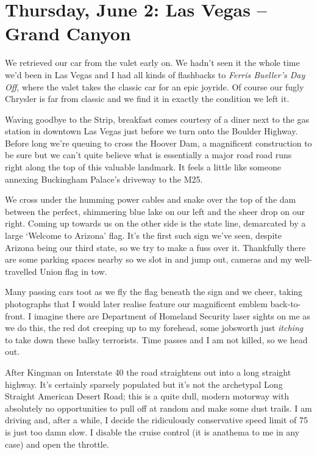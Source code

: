 \documentclass[a5paper,titlepage,draft]{book}
\begin{document}
\chapter[Las Vegas -- Grand Canyon]{Thursday, June 2: Las Vegas -- Grand Canyon}
We retrieved our car from the valet early on.  We hadn't seen it the whole time we'd been in Las Vegas and I had all kinds of flashbacks to \emph{Ferris Bueller's Day Off}, where the valet takes the classic car for an epic joyride.  Of course our fugly Chrysler is far from classic and we find it in exactly the condition we left it.

Waving goodbye to the Strip, breakfast comes courtesy of a diner next to the gas station in downtown Las Vegas just before we turn onto the Boulder Highway.  Before long we're queuing to cross the Hoover Dam, a magnificent construction to be sure but we can't quite believe what is essentially a major road road runs right along the top of this valuable landmark.  It feels a little like someone annexing Buckingham Palace's driveway to the M25.

We cross under the humming power cables and snake over the top of the dam between the perfect, shimmering blue lake on our left and the sheer drop on our right.  Coming up towards us on the other side is the state line, demarcated by a large `Welcome to Arizona' flag.  It's the first such sign we've seen, despite Arizona being our third state, so we try to make a fuss over it.  Thankfully there are some parking spaces nearby so we slot in and jump out, cameras and my well-travelled Union flag in tow.

Many passing cars toot as we fly the flag beneath the sign and we cheer, taking photographs that I would later realise feature our magnificent emblem back-to-front.  I imagine there are Department of Homeland Security laser sights on me as we do this, the red dot creeping up to my forehead, some jobsworth just \emph{itching} to take down these ballsy terrorists.  Time passes and I am not killed, so we head out.

After Kingman on Interstate 40 the road straightens out into a long straight highway.  It's certainly sparsely populated but it's not the archetypal Long Straight American Desert Road; this is a quite dull, modern motorway with absolutely no opportunities to pull off at random and make some dust trails.  I am driving and, after a while, I decide the ridiculously conservative speed limit of 75 is just too damn slow.  I disable the cruise control (it is anathema to me in any case) and open the throttle.
\end{document}
